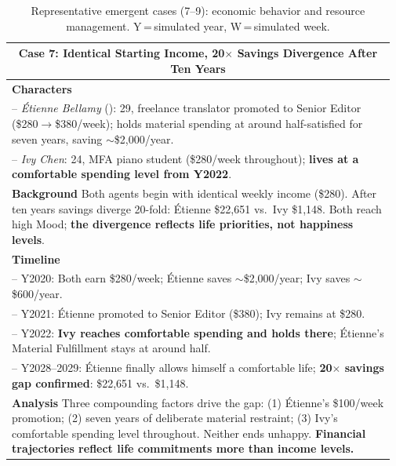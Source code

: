 \begin{table}[htbp]
\centering\small
\caption{Representative emergent cases (7--9): economic behavior and resource management. Y\,=\,simulated year, W\,=\,simulated week.}
\label{tab:cases_7_9}
\begin{tabular}{p{0.97\linewidth}}
\toprule

\multicolumn{1}{c}{\textbf{Case 7: Identical Starting Income, 20$\times$ Savings Divergence After Ten Years}}\\
\midrule
\textbf{Characters}\\
\quad -- \textit{\'{E}tienne Bellamy} (\apartment{}): 29,
  freelance translator promoted to Senior Editor (\$280$\to$\$380/week);
  holds material spending at around half-satisfied for seven years,
  saving $\sim$\$2,000/year.\\
\quad -- \textit{Ivy Chen}: 24, MFA piano student (\$280/week throughout);
  \textbf{lives at a comfortable spending level from Y2022}.\\[2pt]
\textbf{Background}\quad
Both agents begin with identical weekly income (\$280).
After ten years savings diverge 20-fold:
\'{E}tienne \$22,651 vs.\ Ivy \$1,148.
Both reach high Mood;
\textbf{the divergence reflects life priorities, not happiness levels}.\\[2pt]
\textbf{Timeline}\\
\quad -- Y2020: Both earn \$280/week;
  \'{E}tienne saves $\sim$\$2,000/year; Ivy saves $\sim$\$600/year.\\
\quad -- Y2021: \'{E}tienne promoted to Senior Editor (\$380);
  Ivy remains at \$280.\\
\quad -- Y2022: \textbf{Ivy reaches comfortable spending and holds there};
  \'{E}tienne's Material Fulfillment stays at around half.\\
\quad -- Y2028--2029: \'{E}tienne finally allows himself a comfortable life;
  \textbf{20$\times$ savings gap confirmed}: \$22,651 vs.\ \$1,148.\\[2pt]
\textbf{Analysis}\quad
Three compounding factors drive the gap:
(1) \'{E}tienne's \$100/week promotion;
(2) seven years of deliberate material restraint;
(3) Ivy's comfortable spending level throughout.
Neither ends unhappy.
\textbf{Financial trajectories reflect life commitments more than income levels.}\\

\midrule


\end{tabular}
\end{table}

